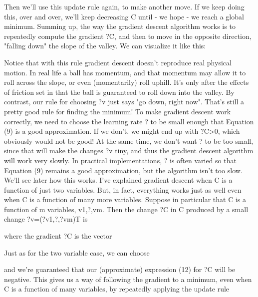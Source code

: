 Then we'll use this update rule again, to make another move. If we keep doing this, over and over, we'll keep decreasing C until - we hope - we reach a global minimum.
Summing up, the way the gradient descent algorithm works is to repeatedly compute the gradient ?C, and then to move in the opposite direction, "falling down" the slope of the valley. We can visualize it like this:

Notice that with this rule gradient descent doesn't reproduce real physical motion. In real life a ball has momentum, and that momentum may allow it to roll across the slope, or even (momentarily) roll uphill. It's only after the effects of friction set in that the ball is guaranteed to roll down into the valley. By contrast, our rule for choosing ?v just says "go down, right now". That's still a pretty good rule for finding the minimum!
To make gradient descent work correctly, we need to choose the learning rate ? to be small enough that Equation (9) is a good approximation. If we don't, we might end up with ?C>0, which obviously would not be good! At the same time, we don't want ? to be too small, since that will make the changes ?v tiny, and thus the gradient descent algorithm will work very slowly. In practical implementations, ? is often varied so that Equation (9) remains a good approximation, but the algorithm isn't too slow. We'll see later how this works. 
I've explained gradient descent when C is a function of just two variables. But, in fact, everything works just as well even when C is a function of many more variables. Suppose in particular that C is a function of m variables, v1,?,vm. Then the change ?C in C produced by a small change ?v=(?v1,?,?vm)T is 

where the gradient ?C is the vector 

Just as for the two variable case, we can choose 

and we're guaranteed that our (approximate) expression (12) for ?C will be negative. This gives us a way of following the gradient to a minimum, even when C is a function of many variables, by repeatedly applying the update rule 

